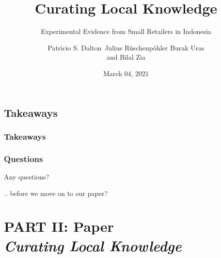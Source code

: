 \documentclass[hideothersubsections, usenames,dvipsnames,10pt]{beamer}
\newenvironment{itemize_3pt}{\itemize\addtolength{\itemsep}{3pt}}{\enditemize}
\begin{document}
\subsection{Takeaways}

\begin{frame}
\frametitle{Takeaways}
	\begin{itemize_3pt}
    \item
   	\vspace{0.10in}
\end{itemize_3pt}
\end{frame}

\begin{frame}
\frametitle{Questions}
	\begin{itemize_3pt}
	\item Any questions?
	\vspace{0.1in}
	\item[] .. before we move on to our paper?
	\end{itemize_3pt}
\end{frame}




\title[]{Curating Local Knowledge}
\subtitle{Experimental Evidence from Small Retailers in Indonesia}

\author[]
{Patricio S. Dalton\
Julius R{\"u}schenp{\"o}hler
Burak Uras\inst{1}\\and
Bilal Zia}


\date{March 04, 2021}


\section{\textbf{PART II: Paper} \\ \quad \emph{Curating Local Knowledge}}


\begin{frame}
\titlepage
\end{frame}
\end{document}
